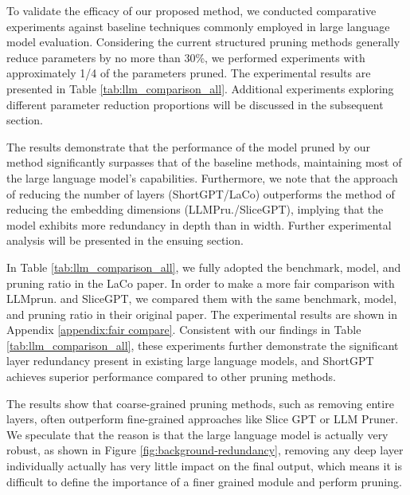 		To validate the efficacy of our proposed method, we conducted comparative experiments against baseline techniques commonly employed in large language model evaluation. Considering the current structured pruning methods generally reduce parameters by no more than 30\%, we performed experiments with approximately 1/4 of the parameters pruned. The experimental results are presented in Table \ref{tab:llm_comparison_all}. Additional experiments exploring different parameter reduction proportions will be discussed in the subsequent section.
		
		The results demonstrate that the performance of the model pruned by our method significantly surpasses that of the baseline methods, maintaining most of the large language model's capabilities. Furthermore, we note that the approach of reducing the number of layers (ShortGPT/LaCo) outperforms the method of reducing the embedding dimensions (LLMPru./SliceGPT), implying that the model exhibits more redundancy in depth than in width. Further experimental analysis will be presented in the ensuing section.
		
		In Table \ref{tab:llm_comparison_all}, we fully adopted the benchmark, model, and pruning ratio in the LaCo paper. In order to make a more fair comparison with LLMprun. and SliceGPT, we compared them with the same benchmark, model, and pruning ratio in their original paper. The experimental results are shown in Appendix \ref{appendix:fair compare}. Consistent with our findings in Table \ref{tab:llm_comparison_all}, these experiments further demonstrate the significant layer redundancy present in existing large language models, and ShortGPT achieves superior performance compared to other pruning methods.
		
		The results show that coarse-grained pruning methods, such as removing entire layers, often outperform fine-grained approaches like Slice GPT or LLM Pruner.  We speculate that the reason is that the large language model is actually very robust, as shown in Figure \ref{fig:background-redundancy}, removing any deep layer individually actually has very little impact on the final output, which means it is difficult to define the importance of a finer grained module and perform pruning.
		
		
		
		
		
		
		
